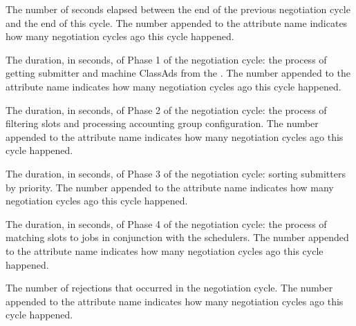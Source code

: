 \begin{description}
\label{attr:LastNegotiationCyclePeriod<X>}
\item[\AdAttr{LastNegotiationCyclePeriod<X>}:] 
The number of seconds elapsed between the end of the previous 
negotiation cycle and the end of this cycle.  
The number  appended to the attribute name indicates 
how many negotiation cycles ago this cycle happened.

\label{attr:LastNegotiationCyclePhase1Duration<X>}
\item[\AdAttr{LastNegotiationCyclePhase1Duration<X>}:] 
The duration, in seconds, of Phase 1 of the negotiation cycle: 
the process of getting submitter and machine ClassAds from the 
.
The number  appended to the attribute name indicates 
how many negotiation cycles ago this cycle happened.

\label{attr:LastNegotiationCyclePhase2Duration<X>}
\item[\AdAttr{LastNegotiationCyclePhase2Duration<X>}:] 
The duration, in seconds, of Phase 2 of the negotiation cycle: 
the process of filtering slots and processing accounting group configuration. 
The number  appended to the attribute name indicates 
how many negotiation cycles ago this cycle happened.

\label{attr:LastNegotiationCyclePhase3Duration<X>}
\item[\AdAttr{LastNegotiationCyclePhase3Duration<X>}:] 
The duration, in seconds, of Phase 3 of the negotiation cycle: 
sorting submitters by priority.  
The number  appended to the attribute name indicates 
how many negotiation cycles ago this cycle happened.

\label{attr:LastNegotiationCyclePhase4Duration<X>}
\item[\AdAttr{LastNegotiationCyclePhase4Duration<X>}:] 
The duration, in seconds, of Phase 4 of the negotiation cycle: 
the process of matching slots to jobs in conjunction with the schedulers. 
The number  appended to the attribute name indicates 
how many negotiation cycles ago this cycle happened.

\label{attr:LastNegotiationCycleRejections<X>}
\item[\AdAttr{LastNegotiationCycleRejections<X>}:] The number of
rejections that occurred in the negotiation cycle.  The number 
appended to the attribute name indicates how many negotiation cycles
ago this cycle happened.


\end{description}

